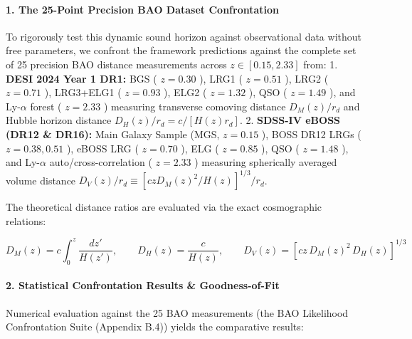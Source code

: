 \documentclass[11pt,a4paper]{article}
\theoremstyle{definition}\newtheorem{definition}{Definition}
\theoremstyle{remark}\newtheorem{remark}{Remark}
\begin{document}
\paragraph{1. The 25-Point Precision BAO Dataset Confrontation}

To rigorously test this dynamic sound horizon against observational data without free parameters, we confront the framework predictions against the complete set of 25 precision BAO distance measurements across $z \in [0.15, 2.33]$ from:
1. \textbf{DESI 2024 Year 1 DR1:} BGS ( $z=0.30$ ), LRG1 ( $z=0.51$ ), LRG2 ( $z=0.71$ ), LRG3+ELG1 ( $z=0.93$ ), ELG2 ( $z=1.32$ ), QSO ( $z=1.49$ ), and Ly-$\alpha$ forest ( $z=2.33$ ) measuring transverse comoving distance $D_M(z)/r_d$ and Hubble horizon distance $D_H(z)/r_d = c / [H(z) r_d]$.
2. \textbf{SDSS-IV eBOSS (DR12 \& DR16):} Main Galaxy Sample (MGS, $z=0.15$ ), BOSS DR12 LRGs ( $z=0.38, 0.51$ ), eBOSS LRG ( $z=0.70$ ), ELG ( $z=0.85$ ), QSO ( $z=1.48$ ), and Ly-$\alpha$ auto/cross-correlation ( $z=2.33$ ) measuring spherically averaged volume distance $D_V(z)/r_d \equiv [c z D_M(z)^2 / H(z)]^{1/3} / r_d$.

The theoretical distance ratios are evaluated via the exact cosmographic relations:


\begin{equation}
D_M(z) = c \int_0^z \frac{dz'}{H(z')}, \qquad D_H(z) = \frac{c}{H(z)}, \qquad D_V(z) = \left[ c z \, D_M(z)^2 \, D_H(z) \right]^{1/3}
\end{equation}

\paragraph{2. Statistical Confrontation Results \& Goodness-of-Fit}

Numerical evaluation against the 25 BAO measurements (the BAO Likelihood Confrontation Suite (Appendix B.4)) yields the comparative results:
\end{document}
